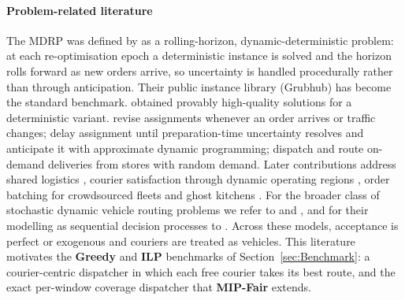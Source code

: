\documentclass[a4paper,11pt,review,3p,authoryear]{elsarticle}
\begin{document}
\paragraph{Problem-related literature}

The MDRP was defined by \cite{reyes2018meal} as a rolling-horizon, dynamic-deterministic problem: at each re-optimisation epoch a deterministic instance is solved and the horizon rolls forward as new orders arrive, so uncertainty is handled procedurally rather than through anticipation. Their public instance library (Grubhub) has become the standard benchmark. \cite{yildiz2019provably} obtained provably high-quality solutions for a deterministic variant. \cite{steever2019dynamic} revise assignments whenever an order arrives or traffic changes; \cite{Ulmer2021} delay assignment until preparation-time uncertainty resolves and anticipate it with approximate dynamic programming; \cite{liu2021multiperiod} dispatch and route on-demand deliveries from stores with random demand. Later contributions address shared logistics \citep{bi2023meal}, courier satisfaction through dynamic operating regions \citep{auad2023courier}, order batching for crowdsourced fleets \citep{simoni2023crowdsourced} and ghost kitchens \citep{neria2024restaurant}. For the broader class of stochastic dynamic vehicle routing problems we refer to \cite{SOEFFKER2022801} and \cite{hildebrandt2022opportunities}, and for their modelling as sequential decision processes to \cite{ulmer2020modeling}. Across these models, acceptance is perfect or exogenous and couriers are treated as vehicles. This literature motivates the \textbf{Greedy} and \textbf{ILP} benchmarks of Section~\ref{sec:Benchmark}: a courier-centric dispatcher in which each free courier takes its best route, and the exact per-window coverage dispatcher that \textbf{MIP-Fair} extends.
\end{document}
